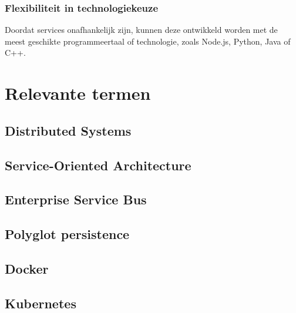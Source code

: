 \subsubsection{Flexibiliteit in technologiekeuze}

Doordat services onafhankelijk zijn, kunnen deze ontwikkeld worden met de meest geschikte programmeertaal of technologie, zoals Node.js, Python, Java of C++.

\section{Relevante termen}

\subsection{Distributed Systems}
\label{sec:distributed systems}

\subsection{Service-Oriented Architecture}
\label{sec:SOA_architectuur}

\subsection{Enterprise Service Bus}
\label{sec:ESB}

\subsection{Polyglot persistence}
\label{sec:Polyglot Persistence}

\subsection{Docker}

\subsection{Kubernetes}




